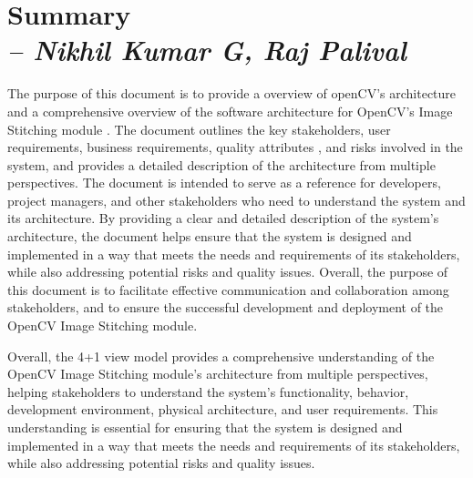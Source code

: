 \chapter{Summary\\
\small{\textit{-- Nikhil Kumar G, Raj Palival}}
\label{Chapter::Summary}}

\par{The purpose of this document is to provide a overview of openCV's architecture and a comprehensive overview of the software architecture for OpenCV's Image Stitching module \cite{openCVReport}. The document outlines the key stakeholders, user requirements, business requirements, quality attributes \cite{qualityattributes}, and risks involved in the system, and provides a detailed description of the architecture from multiple perspectives. The document is intended to serve as a reference for developers, project managers, and other stakeholders who need to understand the system and its architecture. By providing a clear and detailed description of the system's architecture, the document helps ensure that the system is designed and implemented in a way that meets the needs and requirements of its stakeholders, while also addressing potential risks and quality issues. Overall, the purpose of this document is to facilitate effective communication and collaboration among stakeholders, and to ensure the successful development and deployment of the OpenCV Image Stitching module.}\\

\par{Overall, the 4+1 view model provides a comprehensive understanding of the OpenCV Image Stitching module's architecture from multiple perspectives, helping stakeholders to understand the system's functionality, behavior, development environment, physical architecture, and user requirements. This understanding is essential for ensuring that the system is designed and implemented in a way that meets the needs and requirements of its stakeholders, while also addressing potential risks and quality issues.
}